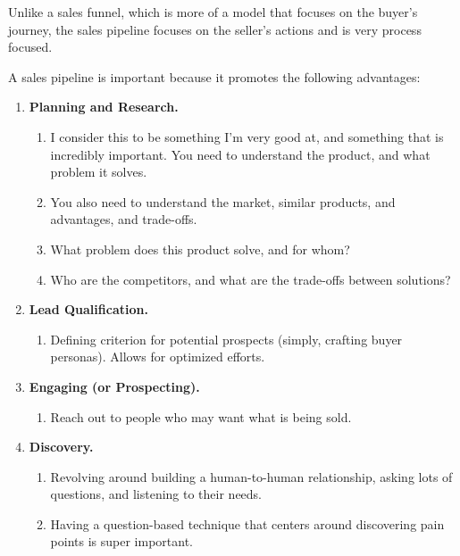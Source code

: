 Unlike a sales funnel, which is more of a model that focuses on the buyer's journey,
the sales pipeline focuses on the seller's actions and is very process focused.

\medskip

A sales pipeline is important because it promotes the following advantages:

\begin{enumerate}

    \item \textbf{Planning and Research.}
    \begin{enumerate}
        \item I consider this to be something I'm very good at, and something that is
        incredibly important. You need to understand the product, and what problem it
        solves.
        \item You also need to understand the market, similar products, and advantages,
        and trade-offs.
        \item What problem does this product solve, and for whom?
        \item Who are the competitors, and what are the trade-offs between solutions?
    \end{enumerate}

    \item \textbf{Lead Qualification.}
    \begin{enumerate}
        \item Defining criterion for potential prospects (simply, crafting buyer
        personas). Allows for optimized efforts.
    \end{enumerate}

    \item \textbf{Engaging (or Prospecting).}
    \begin{enumerate}
        \item Reach out to people who may want what is being sold.
    \end{enumerate}

    \item \textbf{Discovery.}
    \begin{enumerate}
        \item Revolving around building a human-to-human relationship, asking lots of
        questions, and listening to their needs.
        \item Having a question-based technique that centers
        around discovering pain points is super important.
    \end{enumerate}


\end{enumerate}
